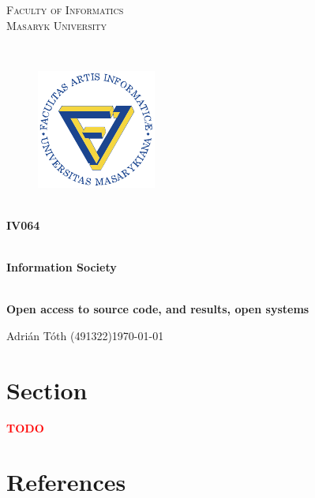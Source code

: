 \documentclass[11pt,a4paper]{article}
\newcommand{\TODO}{\textbf{\textcolor{red}{TODO}}} %
\begin{document}
\begin{titlepage}

    \begin{center}
        \vfill {%
            \Huge{%
                \textsc{%
                    Faculty of Informatics\\[3mm]%
                    Masaryk University%
                }%
            }%
        }%

        \hfill\\[15mm]

        \begin{figure}[!h]
            \centering
            \includegraphics[scale=3]{img/muni-fi-logo.pdf}
        \end{figure}

        \hfill\\[10mm]

        \Huge{
            \textbf{
                IV064
            }
        }

        \hfill\\[-10mm]

        \huge{
            \textbf{
                Information Society
            }
        }

        \hfill\\[10mm]

        \LARGE{
            \textbf{
                Open access to source code, and results, open systems
            }
        }
        \vfill

    \end{center}

        \Large{
            \noindent Adrián Tóth (491322)\hfill \today
        }

\end{titlepage}

\setlength{\parskip}{0pt}
    {
        \hypersetup{
            hidelinks=true
        }
        \tableofcontents
    }
\setlength{\parskip}{0pt}

\newpage

\section{Section}

    \TODO\cite{BOOK}

\newpage

\section{References}

\begin{flushleft}
    
\end{flushleft}
\end{document}
